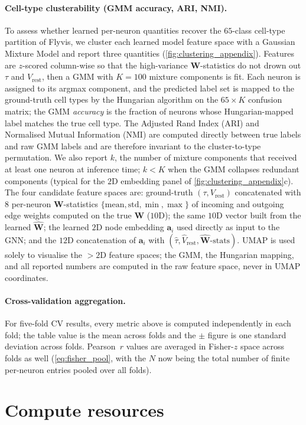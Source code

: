 \documentclass{article}
\begin{document}
\paragraph{Cell-type clusterability (GMM accuracy, ARI, NMI).}
To assess whether learned per-neuron quantities recover the $65$-class
cell-type partition of Flyvis, we cluster each learned model feature space with a Gaussian Mixture Model and report three quantities
(\cref{fig:clustering_appendix}). Features are $z$-scored
column-wise so that the high-variance $\mathbf{W}$-statistics do not
drown out $\tau$ and $V_{\mathrm{rest}}$, then a GMM with $K=100$
mixture components is fit. Each neuron is assigned to its argmax
component, and the predicted label set is mapped to the ground-truth
cell types by the Hungarian algorithm on the $65 \times K$ confusion
matrix; the GMM \emph{accuracy} is the fraction of neurons whose
Hungarian-mapped label matches the true cell type. The Adjusted Rand
Index (ARI) and Normalised Mutual Information (NMI) are computed
directly between true labels and raw GMM labels and are therefore
invariant to the cluster-to-type permutation. We also report $k$, the
number of mixture components that received at least one neuron at
inference time; $k < K$ when the GMM collapses redundant components
(typical for the $2$D embedding panel of
\cref{fig:clustering_appendix}c). The four candidate feature spaces are: ground-truth $(\tau, V_{\mathrm{rest}})$ concatenated with $8$ per-neuron $\mathbf{W}$-statistics
$\{\mathrm{mean}, \mathrm{std}, \min, \max\}$ of incoming and outgoing
edge weights computed on the true $\mathbf{W}$ ($10$D); the same
$10$D vector built from the learned $\hat{\mathbf{W}}$; the
learned $2$D node embedding $\mathbf{a}_i$ used directly as input to
the GNN; and the $12$D concatenation of $\mathbf{a}_i$ with
$(\hat{\tau}, \hat{V}_{\mathrm{rest}},
\hat{\mathbf{W}}\text{-stats})$. UMAP is used solely to visualise
the $>2$D feature spaces; the GMM, the Hungarian mapping, and all
reported numbers are computed in the raw feature space, never in UMAP
coordinates.

\paragraph{Cross-validation aggregation.}
For five-fold CV results, every metric above is computed independently
in each fold; the table value is the mean across folds and the
$\pm$ figure is one standard deviation across folds. Pearson~$r$
values are averaged in Fisher-$z$ space across folds as well
(\cref{eq:fisher_pool}, with the $N$ now being the total number of
finite per-neuron entries pooled over all folds).





\section{Compute resources}




\newpage


\end{document}

